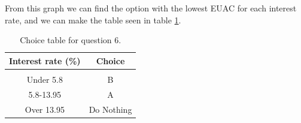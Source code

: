 \documentclass[letterpaper, reqno,11pt]{article}
\begin{document}
From this graph we can find the option with the lowest EUAC for each interest rate, and we can make the table seen in table \ref{tab:q6}. 

\begin{table}[htpb]
    \centering
    \caption{Choice table for question 6. }
    \label{tab:q6}
    \begin{tabular}{c|c}
        Interest rate (\%)&Choice\\
        \hline\\
        Under 5.8&B\\
        5.8-13.95&A\\
        Over 13.95&Do Nothing

    \end{tabular}
\end{table}
\end{document}
